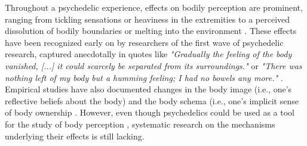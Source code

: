 \documentclass{article}
\begin{document}
\begin{comment}
    • The Introduction should not include any subheadings. 

    • The Introduction (and the manuscript in its entirety) must not include priority or novelty claims (except in the case of genetic or archaeological discovery). 

    • References in the main text should appear as superscript numerals, in order of mention. Only articles that have been published or accepted by a named publication or recognized preprint server should be in the reference list. If a manuscript is under consideration or not yet submitted, it should be mentioned in the main text only in parentheses, as follows: (Up to five author names, et al., unpublished manuscript). Published conference abstracts, numbered patents and research datasets that have been assigned a digital object identifier may be included in the reference list. 
\end{comment}

Throughout a psychedelic experience, effects on bodily perception are prominent, ranging from tickling sensations or heaviness in the extremities to a perceived dissolution of bodily boundaries or melting into the environment \parencite{preller2016phenomenology}.
These effects have been recognized early on by researchers of the first wave of psychedelic research, captured anecdotally in quotes like \emph{"Gradually the feeling of the body vanished, [...] it could scarcely be separated from its surroundings."} or \emph{"There was nothing left of my body but a humming feeling; I had no bowels any more."} \parencite{guttmann1936mescaline}. Empirical studies have also documented changes in the body image (i.e., one's reflective beliefs about the body)  and the body schema (i.e., one's implicit sense of body ownership \parencite[for review, see][]{aday2021firsterarev, preller2016phenomenology}.
However, even though psychedelics could be used as a tool for the study of body perception \parencite{aday2021firsterarev}, systematic research on the mechanisms underlying their effects is still lacking.
\end{document}
